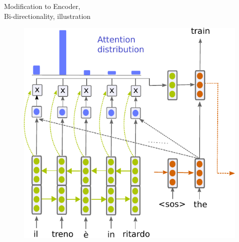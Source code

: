 \begin{frame}{Modification to Encoder,\\Bi-directionality, illustration}
\begin{figure}
  \begin{center}
    \includegraphics[height=0.9\textheight]{figures/bienc-dec-att.pdf}
  \end{center}
\vspace{-3mm}
\end{figure}
\end{frame}

